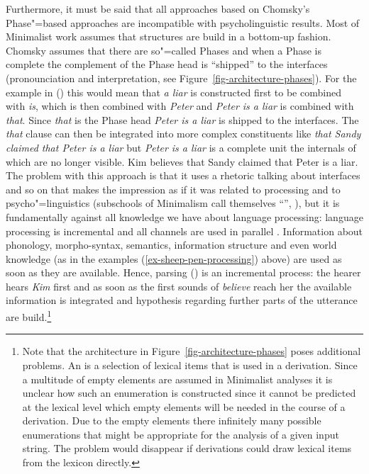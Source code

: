 \documentclass[output=paper]{langsci/langscibook}
\begin{document}
Furthermore, it must be said that all approaches based on Chomsky's Phase"=based approaches
\citep{Chomsky99a,Chomsky2008a} are incompatible with psycholinguistic results. Most of Minimalist
work assumes that structures are build in a bottom-up fashion. Chomsky 
assumes that there are so"=called Phases and when a Phase is complete the complement of
the Phase head is ``shipped'' to the interfaces (pronounciation and interpretation,
see Figure~\ref{fig-architecture-phases}). For the example in () this 
would mean that \emph{a liar} is constructed first to be combined with \emph{is}, which is then
combined with \emph{Peter} and \emph{Peter is a liar} is combined with \emph{that}. Since
\emph{that} is the Phase head \emph{Peter is a liar} is shipped to the interfaces. The \emph{that}
clause can then be integrated into more complex constituents like \emph{that Sandy claimed that
  Peter is a liar} but \emph{Peter is a liar} is a complete unit the internals of which are no
longer visible.
\ea
Kim believes that Sandy claimed that Peter is a liar.
\z 
The problem with this approach is that it uses a rhetoric talking about interfaces and so on that
makes the impression as if it was related to processing and to psycho"=linguistics (subschools of
Minimalism call themselves ``'', \eg \citealt{BC2011a-u,DSB2011a-ed}), but it is fundamentally against all knowledge
we have about language processing: language processing is incremental and all channels are used in
parallel \citep{Marslen-Wilson75a,TSKES95a,TSKES96a}. Information about phonology, morpho-syntax, semantics, information structure and even
world knowledge (as in the examples (\ref{ex-sheep-pen-processing}) above) are used as soon as they
are available. Hence, parsing () is an incremental process: the hearer hears \emph{Kim} first
and as soon as the first sounds of \emph{believe} reach her the available information is integrated
and hypothesis regarding further parts of the utterance are build.\footnote{
  Note that the architecture in Figure~\ref{fig-architecture-phases} poses additional problems. An
  \emph{} is a selection of lexical items that is used in a derivation. Since a multitude
  of empty elements are assumed in Minimalist analyses it is unclear how such an enumeration is
  constructed since it cannot be predicted at the lexical level which empty elements will be needed in the course of a
  derivation. Due to the empty elements there infinitely many possible enumerations that might be
  appropriate for the analysis of a given input string. The problem would disappear if derivations
  could draw lexical items from the lexicon directly.
}
\end{document}

